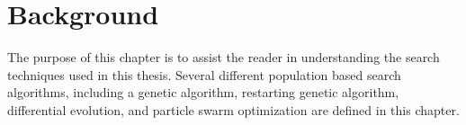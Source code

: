 \chapter{Background}

The purpose of this chapter is to assist the reader in understanding the search techniques used in this thesis. Several different population based search algorithms, including a genetic algorithm, restarting genetic algorithm, differential evolution, and particle swarm optimization are defined in this chapter.


% 



% 
